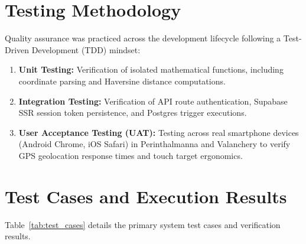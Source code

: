 \documentclass[12pt,a4paper]{report}
\begin{document}
\section{Testing Methodology}
Quality assurance was practiced across the development lifecycle following a Test-Driven Development (TDD) mindset:
\begin{enumerate}
    \item \textbf{Unit Testing:} Verification of isolated mathematical functions, including coordinate parsing and Haversine distance computations.
    \item \textbf{Integration Testing:} Verification of API route authentication, Supabase SSR session token persistence, and Postgres trigger executions.
    \item \textbf{User Acceptance Testing (UAT):} Testing across real smartphone devices (Android Chrome, iOS Safari) in Perinthalmanna and Valanchery to verify GPS geolocation response times and touch target ergonomics.
\end{enumerate}

\section{Test Cases and Execution Results}
Table~\ref{tab:test_cases} details the primary system test cases and verification results.
\end{document}
